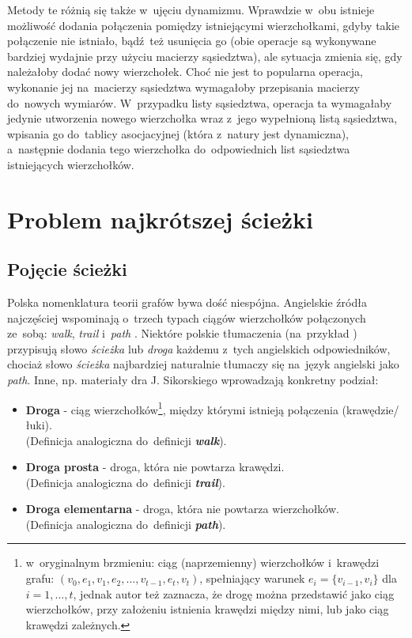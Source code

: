 \documentclass[11pt,a4paper,oneside]{report}
\begin{document}
Metody te różnią się także w~ujęciu dynamizmu. Wprawdzie w~obu istnieje możliwość dodania połączenia pomiędzy istniejącymi wierzchołkami, gdyby takie połączenie nie istniało, bądź też usunięcia go (obie operacje są wykonywane bardziej wydajnie przy użyciu macierzy sąsiedztwa), ale sytuacja zmienia się, gdy należałoby dodać nowy wierzchołek. Choć nie jest to popularna operacja, wykonanie jej na~macierzy sąsiedztwa wymagałoby przepisania macierzy do~nowych wymiarów. W~przypadku listy sąsiedztwa, operacja ta wymagałaby jedynie utworzenia nowego wierzchołka wraz z~jego wypełnioną listą sąsiedztwa, wpisania go do~tablicy asocjacyjnej (która z~natury jest dynamiczna), a~następnie dodania tego wierzchołka do~odpowiednich list sąsiedztwa istniejących wierzchołków.


\section{Problem najkrótszej ścieżki}

\subsection{Pojęcie ścieżki}

Polska nomenklatura teorii grafów bywa dość niespójna. Angielskie źródła najczęściej wspominają o~trzech typach ciągów wierzchołków połączonych ze~sobą: \textit{walk}, \textit{trail} i~\textit{path} \cite{wilson-1996-introductiontographtheory}. Niektóre polskie tłumaczenia (na~przykład \cite{horzyk-2018-grafyistrukturygrafowe}) przypisują słowo \textit{ścieżka} lub \textit{droga} każdemu z~tych angielskich odpowiedników, chociaż słowo \textit{ścieżka} najbardziej naturalnie tłumaczy się na~język angielski jako \textit{path}. Inne, np. materiały dra J. Sikorskiego \cite{sikorski-nd-matematykadyskretna} wprowadzają konkretny podział:
\begin{itemize}
	\item \textbf{Droga} - ciąg wierzchołków\footnote{w~oryginalnym brzmieniu: ciąg (naprzemienny) wierzchołków i~krawędzi grafu: $(v_0, e_1, v_1, e_2, ..., v_{t-1}, e_t, v_t)$, spełniający warunek $e_i = \{v_{i-1}, v_i\}$ dla $i = 1, ..., t$, jednak autor też zaznacza, że drogę można przedstawić jako ciąg wierzchołków, przy założeniu istnienia krawędzi między nimi, lub jako ciąg krawędzi zależnych.}, między którymi istnieją połączenia (krawędzie/łuki). \\ (Definicja analogiczna do~definicji \textit{\textbf{walk}}).
	\item \textbf{Droga prosta} - droga, która nie powtarza krawędzi. \\ (Definicja analogiczna do~definicji \textit{\textbf{trail}}).
	\item \textbf{Droga elementarna} - droga, która nie powtarza wierzchołków. \\ (Definicja analogiczna do~definicji \textit{\textbf{path}}).
\end{itemize}
\end{document}
